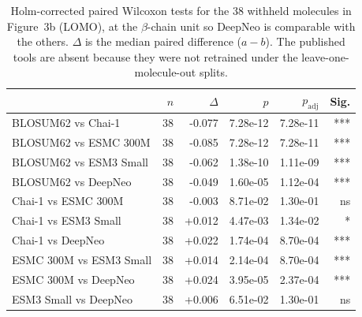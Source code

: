 \begin{table}[H]
\centering
\small
\caption{Holm-corrected paired Wilcoxon tests for the 38 withheld molecules in Figure~3b (LOMO), at the $\beta$-chain unit so DeepNeo is comparable with the others. $\Delta$ is the median paired difference ($a-b$). The published tools are absent because they were not retrained under the leave-one-molecule-out splits.}
\label{tab:supp-lomo-pairs}
\begin{tabular}{lrrrrr}
\toprule
 & \textbf{$n$} & \textbf{$\Delta$} & \textbf{$p$} & \textbf{$p_{\mathrm{adj}}$} & \textbf{Sig.} \\
\midrule
BLOSUM62 vs Chai-1 & 38 & -0.077 & 7.28e-12 & 7.28e-11 & *** \\
BLOSUM62 vs ESMC 300M & 38 & -0.085 & 7.28e-12 & 7.28e-11 & *** \\
BLOSUM62 vs ESM3 Small & 38 & -0.062 & 1.38e-10 & 1.11e-09 & *** \\
BLOSUM62 vs DeepNeo & 38 & -0.049 & 1.60e-05 & 1.12e-04 & *** \\
Chai-1 vs ESMC 300M & 38 & -0.003 & 8.71e-02 & 1.30e-01 & ns \\
Chai-1 vs ESM3 Small & 38 & +0.012 & 4.47e-03 & 1.34e-02 & * \\
Chai-1 vs DeepNeo & 38 & +0.022 & 1.74e-04 & 8.70e-04 & *** \\
ESMC 300M vs ESM3 Small & 38 & +0.014 & 2.14e-04 & 8.70e-04 & *** \\
ESMC 300M vs DeepNeo & 38 & +0.024 & 3.95e-05 & 2.37e-04 & *** \\
ESM3 Small vs DeepNeo & 38 & +0.006 & 6.51e-02 & 1.30e-01 & ns \\
\bottomrule
\end{tabular}
\end{table}
